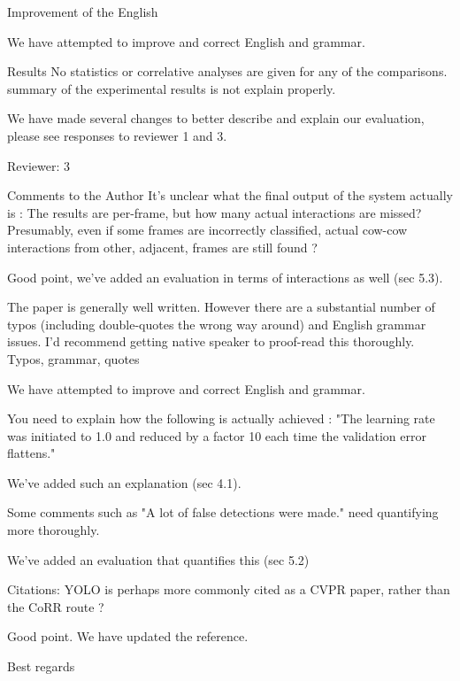 \documentclass[10pt,a4paper]{letter}
\begin{document}
\begin{letter}{}
\begin{siderules}
Improvement of the English
\end{siderules}

We have attempted to improve and correct English and grammar.

\begin{siderules}
Results No statistics or correlative analyses are given for any of the comparisons.
summary of the experimental results is not explain properly.
\end{siderules}

We have made several changes to better describe and explain our evaluation, please see responses to reviewer 1 and 3.

\begin{siderules}
Reviewer: 3

Comments to the Author
It's unclear what the final output of the system actually is : The results are per-frame, but how many actual interactions are missed? 
Presumably, even if some frames are incorrectly classified, actual cow-cow interactions from other, adjacent, frames are still found ?
\end{siderules}

Good point, we've added an evaluation in terms of interactions as well (sec 5.3).

\begin{siderules}
The paper is generally well written. However there are a substantial number of typos (including double-quotes the wrong way around) and English grammar issues. I'd recommend getting
native speaker to proof-read this thoroughly. Typos, grammar, quotes
\end{siderules}

We have attempted to improve and correct English and grammar.

\begin{siderules}
You need to explain how the following is actually achieved : "The learning rate was initiated to 1.0 and reduced by a factor 10 each time the validation 
error flattens."
\end{siderules}

We've added such an explanation (sec 4.1).

\begin{siderules}
Some comments such as "A lot of false detections were made." need quantifying more thoroughly.
\end{siderules}

We've added an evaluation that quantifies this (sec 5.2)

\begin{siderules}
Citations: YOLO is perhaps more commonly cited as a CVPR paper, rather than the CoRR route ?
\end{siderules}

Good point. We have updated the reference.


 
\closing{Best regards} 
\end{letter} 
\end{document}
